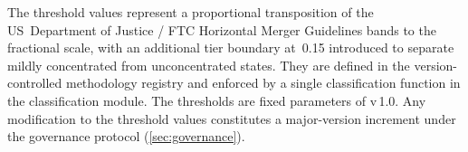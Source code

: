 The threshold values represent a proportional transposition of the
US~Department of Justice / FTC Horizontal Merger Guidelines \HHI bands
\citep{doj2023merger} to the fractional scale, with an additional tier
boundary at~\num{0.15} introduced to separate mildly concentrated from
unconcentrated states.  They are defined in the version-controlled methodology
registry and enforced by a single classification function in the classification
module.  The thresholds are fixed parameters of \ISI v\,1.0.  Any modification to the
threshold values constitutes a major-version increment under the governance
protocol (\cref{sec:governance}).